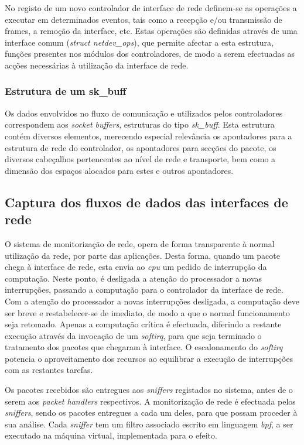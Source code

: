 No registo de um novo controlador de interface de rede definem-se as operações a executar em determinados eventos, tais como a recepção e/ou transmissão de frames, a remoção da interface, etc.
Estas operações são definidas através de uma interface comum (\textit{struct netdev\_ops}), que permite afectar a esta estrutura, funções presentes nos módulos dos controladores, de modo a serem efectuadas as acções necessárias à utilização da interface de rede.

\subsubsection{Estrutura de um sk\_buff}
\label{subsub:sk_buff}
Os dados envolvidos no fluxo de comunicação e utilizados pelos controladores correspondem aos \textit{socket buffers}, estruturas do tipo \textit{sk\_buff}.
Esta estrutura contém diversos elementos, merecendo especial relevância os apontadores para a estrutura de rede do controlador, os apontadores para secções do pacote, os diversos cabeçalhos pertencentes ao nível de rede e transporte, bem como a dimensão dos espaços alocados para estes e outros apontadores.

\subsection{Captura dos fluxos de dados das interfaces de rede}
\label{sub:network_cap}
O sistema de monitorização de rede, opera de forma transparente à normal utilização da rede, por parte das aplicações.
Desta forma, quando um pacote chega à interface de rede, esta envia ao \textit{cpu} um pedido de interrupção da computação.
Neste ponto, é desligada a atenção do processador a novas interrupções, passando a computação para o controlador da interface de rede.
Com a atenção do processador a novas interrupções desligada, a computação deve ser breve e restabelecer-se de imediato, de modo a que o normal funcionamento seja retomado.
Apenas a computação crítica é efectuada, diferindo a restante execução através da invocação de um \textit{softirq}, para que seja terminado o tratamento dos pacotes que chegaram à interface.
O escalonamento do \textit{softirq} potencia o aproveitamento dos recursos ao equilibrar a execução de interrupções com as restantes tarefas.

Os pacotes recebidos são entregues aos \textit{sniffers} registados no sistema, antes de o serem aos \textit{packet handlers} respectivos.
A monitorização de rede é efectuada pelos \textit{sniffers}, sendo os pacotes entregues a cada um deles, para que possam proceder à sua análise.
Cada \textit{sniffer} tem um filtro associado escrito em linguagem \textit{bpf}, a ser executado na máquina virtual, implementada para o efeito.

